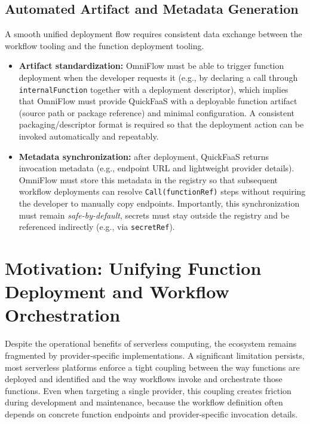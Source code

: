 \subsection{Automated Artifact and Metadata Generation}
A smooth unified deployment flow requires consistent data exchange between the workflow tooling and the function deployment tooling.
\begin{itemize}
	\item \textbf{Artifact standardization:} OmniFlow must be able to trigger function deployment when the developer requests it (e.g., by declaring a call through \texttt{internalFunction} together with a deployment descriptor), which implies that OmniFlow must provide QuickFaaS with a deployable function artifact (source path or package reference) and minimal configuration. A consistent packaging/descriptor format is required so that the deployment action can be invoked automatically and repeatably.

	\item \textbf{Metadata synchronization:} after deployment, QuickFaaS returns invocation metadata (e.g., endpoint URL and lightweight provider details). OmniFlow must store this metadata in the registry so that subsequent workflow deployments can resolve \texttt{Call(functionRef)} steps without requiring the developer to manually copy endpoints. Importantly, this synchronization must remain \textit{safe-by-default}, secrets must stay outside the registry and be referenced indirectly (e.g., via \texttt{secretRef}).
\end{itemize}



\section{Motivation: Unifying Function Deployment and Workflow Orchestration}
\label{sec:int_motivation}

Despite the operational benefits of serverless computing, the ecosystem remains fragmented by provider-specific implementations. A significant limitation persists, most serverless platforms enforce a tight coupling between the way functions are deployed and identified and the way workflows invoke and orchestrate those functions. Even when targeting a single provider, this coupling creates friction during development and maintenance, because the workflow definition often depends on concrete function endpoints and provider-specific invocation details.

